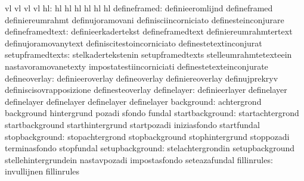                                   vl                               vl
                                  vl                               vl
                              hl: hl                               hl
                                  hl                               hl
                                  hl                               hl
                    defineframed: definieeromlijnd                 defineframed
                                  definiereumrahmt                 definujoramovani
                                  definisciincorniciato            definesteinconjurare
                defineframedtext: definieerkadertekst              defineframedtext
                                  definiereumrahmtertext           definujoramovanytext
                                  definiscitestoincorniciato       definestetextinconjurat
                setupframedtexts: stelkadertekstenin               setupframedtexts
                                  stelleumrahmtetexteein           nastavoramovanetexty
                                  impostatestiincorniciati         definestetexteinconjurate
                   defineoverlay: definieeroverlay                 defineoverlay
                                  definiereoverlay                 definujprekryv
                                  definiscisovrapposizione         definesteoverlay
                     definelayer: definieerlayer                   definelayer
                                  definelayer                      definelayer
                                  definelayer                      definelayer
                      background: achtergrond                      background
                                  hintergrund                      pozadi
                                  sfondo                           fundal
                 startbackground: startachtergrond                 startbackground
                                  starthintergrund                 startpozadi
                                  iniziasfondo                     startfundal
                  stopbackground: stopachtergrond                  stopbackground
                                  stophintergrund                  stoppozadi
                                  terminasfondo                    stopfundal
                 setupbackground: stelachtergrondin                setupbackground
                                  stellehintergrundein             nastavpozadi
                                  impostasfondo                    seteazafundal
                     fillinrules: invullijnen                      fillinrules
